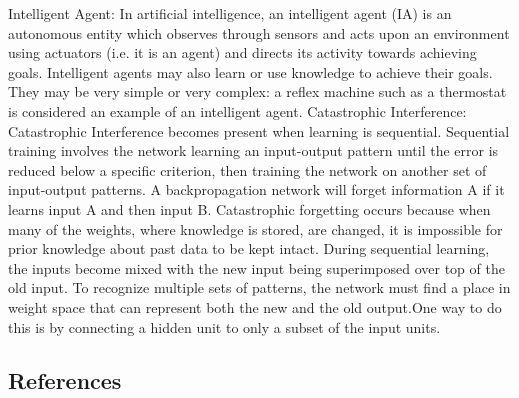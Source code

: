\documentclass[draftclsnofoot, onecolumn, 10pt, compsoc]{IEEEtran}
\begin{document}
\newline \newline
Intelligent Agent: In artificial intelligence, an intelligent agent (IA) is an autonomous entity which observes through sensors and acts upon an environment using actuators (i.e. it is an agent) and directs its activity towards achieving goals. Intelligent agents may also learn or use knowledge to achieve their goals. They may be very simple or very complex: a reflex machine such as a thermostat is considered an example of an intelligent agent.
\cite{Norvig}
\newline \newline
Catastrophic Interference: Catastrophic Interference becomes present when learning is sequential. Sequential training involves the network learning an input-output pattern until the error is reduced below a specific criterion, then training the network on another set of input-output patterns. A backpropagation network will forget information A if it learns input A and then input B. Catastrophic forgetting occurs because when many of the weights, where knowledge is stored, are changed, it is impossible for prior knowledge about past data to be kept intact. During sequential learning, the inputs become mixed with the new input being superimposed over top of the old input. To recognize multiple sets of patterns, the network must find a place in weight space that can represent both the new and the old output.One way to do this is by connecting a hidden unit to only a subset of the input units. \cite{ImgRecog}
\cite{miller}
\subsection{References}


\end{document}
